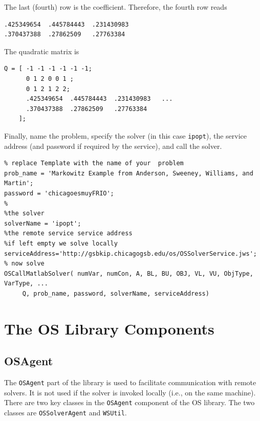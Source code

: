 \documentclass[11pt]{article}
\renewcommand{\_}{{\char"5F}}
\renewcommand{\{}{{\char"7B}}
\renewcommand{\}}{{\char"7D}}
\renewcommand{\^}{{\char"0D}}
\renewcommand{\'}{{\char"0D}}
\begin{document}
\begin{enumerate}[Step 1:]
The last (fourth) row is the coefficient. Therefore, the fourth row reads





\begin{verbatim}
.425349654  .445784443  .231430983
.370437388  .27862509   .27763384
\end{verbatim}


The quadratic matrix is



\begin{verbatim}
Q = [ -1 -1 -1 -1 -1 -1;
      0 1 2 0 0 1 ;
      0 1 2 1 2 2;
      .425349654  .445784443  .231430983   ...
      .370437388  .27862509   .27763384
    ];
\end{verbatim}


Finally, name the problem, specify the solver (in this case {\tt ipopt}), the service address (and password if required by the service), and call the solver.



\begin{verbatim}
% replace Template with the name of your  problem
prob_name = 'Markowitz Example from Anderson, Sweeney, Williams, and Martin';
password = 'chicagoesmuyFRIO';
%
%the solver
solverName = 'ipopt';
%the remote service service address
%if left empty we solve locally
serviceAddress='http://gsbkip.chicagogsb.edu/os/OSSolverService.jws';
% now solve
OSCallMatlabSolver( numVar, numCon, A, BL, BU, OBJ, VL, VU, ObjType, VarType, ...
     Q, prob_name, password, solverName, serviceAddress)
\end{verbatim}



\section{The OS Library Components}\label{section:oslibrary} 

\subsection{OSAgent}\label{section:osagent}

The {\tt OSAgent}  part of the library is used to facilitate communication
with remote solvers. It is not used if the solver is invoked locally (i.e., on the same machine).
There are two key classes in the {\tt OSAgent} component of the OS library. The two classes are
{\tt OSSolverAgent} and {\tt WSUtil}.


\end{enumerate}
\end{document}

